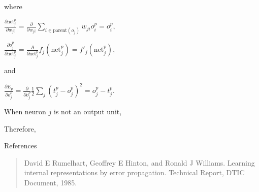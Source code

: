 \documentclass[]{article}
\begin{document}
where

\(\frac{\partial \text{net}^p_j}{\partial w_{ji}} = \frac{\partial}{\partial w_{ji}} \sum_{i \in \text{parent}(o_j)} w_{ji} o^p_i = o^p_i,\)

\(\frac{\partial o^p_j}{\partial \text{net}^p_j} = \frac{\partial}{\partial \text{net}^p_j} f_j\left( \text{net}^p_j \right) = f'_j\left( \text{net}^p_j \right),\)

and

\(\frac{\partial E_p}{\partial o^p_j} = \frac{\partial}{\partial o^p_j} \frac{1}{2} \sum_j (t^p_j - o^p_j)^2 = o^p_j - t^p_j.\)

When neuron \(j\) is not an output unit,



Therefore,


References

\begin{quote}
David E Rumelhart, Geoffrey E Hinton, and Ronald J Williams. Learning
internal representations by error propagation. Technical Report, DTIC
Document, 1985.
\end{quote}
\end{document}
